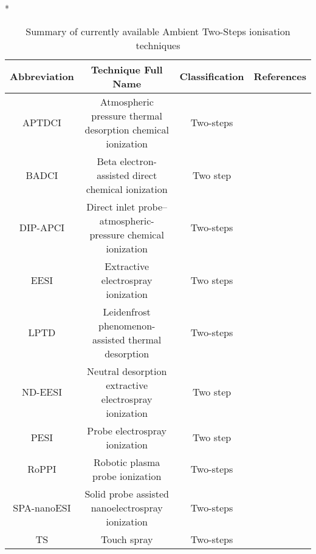 \begin{table}{*}
\caption{Summary of currently available Ambient Two-Steps ionisation techniques}
\label{table:Ambient_TwoSteps}

\centering 
\scriptsize

    \begin{tabular}{|c|c|c|l|}
        \hline
        \textbf{Abbreviation}  & \textbf{Technique Full Name} & \textbf{Classification} & \textbf{References} \\ 
        \hline \hline 
        APTDCI & Atmospheric pressure thermal desorption chemical ionization & Two-steps & \cite{21683155} \\
        BADCI & Beta electron-assisted direct chemical ionization & Two step &  \cite{19641814} \\
        DIP-APCI & Direct inlet probe–atmospheric-pressure chemical ionization & Two-steps & \cite{23912829} \\
        EESI & Extractive electrospray ionization & Two steps & \cite{16767269} \\
        LPTD & Leidenfrost phenomenon-assisted thermal desorption & Two-steps & \cite{23423791} \\
        ND-EESI &  Neutral desorption extractive electrospray ionization & Two step & \cite{17721903} \\
        PESI & Probe electrospray ionization & Two step & \cite{17708527}\\
        RoPPI & Robotic plasma probe ionization & Two-steps & \cite{24603806} \\
        SPA-nanoESI & Solid probe assisted nanoelectrospray ionization & Two-steps & \cite{22937532} \\
        TS & Touch spray & Two-steps & \cite{24756256} \\
        \hline \hline 
    \end{tabular}
\end{table}
